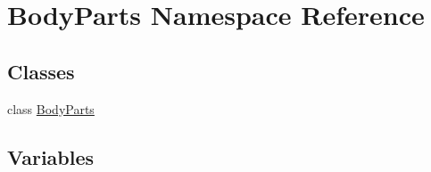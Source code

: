 \hypertarget{namespace_body_parts}{}\section{Body\+Parts Namespace Reference}
\label{namespace_body_parts}
\subsection*{Classes}
\begin{DoxyCompactItemize}
\item 
class \hyperlink{class_body_parts_1_1_body_parts}{Body\+Parts}
\end{DoxyCompactItemize}
\subsection*{Variables}
